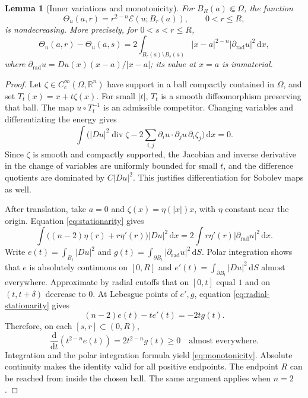 \documentclass[11pt,a4paper]{article}
\numberwithin{equation}{section}
\newtheorem{lemma}[theorem]{Lemma}
\theoremstyle{definition}
\newcommand{\R}{\mathbb R}
\newcommand{\dd}{\,\mathrm d}
\newcommand{\dx}{\dd x}
\newcommand{\E}{\mathcal E}
\newcommand{\Th}{\Theta}
\begin{document}
\begin{lemma}[Inner variations and monotonicity]\label{lem:monotonicity}
For $B_R(a)\Subset\Omega$, the function
\[
\Th_u(a,r)=r^{2-n}\E(u;B_r(a)),\qquad0<r\le R,
\]
is nondecreasing. More precisely, for $0<s<r\le R$,
\begin{equation}\label{eq:monotonicity}
\Th_u(a,r)-\Th_u(a,s)
=2\int_{B_r(a)\setminus B_s(a)}
|x-a|^{2-n}|\partial_{\mathrm{rad}}u|^2\dx,
\end{equation}
where $\partial_{\mathrm{rad}}u=Du(x)(x-a)/|x-a|$; its value at $x=a$ is immaterial.
\end{lemma}
\begin{proof}
Let $\zeta\in C_c^\infty(\Omega,\R^n)$ have support in a ball compactly contained in $\Omega$, and set $T_t(x)=x+t\zeta(x)$. For small $|t|$, $T_t$ is a smooth diffeomorphism preserving that ball. The map $u\circ T_t^{-1}$ is an admissible competitor. Changing variables and differentiating the energy gives
\begin{equation}\label{eq:stationarity}
\int\bigl(|Du|^2\operatorname{div}\zeta
-2\sum_{i,j}\partial_i u\cdot\partial_j u\,\partial_i\zeta_j\bigr)\dx=0.
\end{equation}
Since $\zeta$ is smooth and compactly supported, the Jacobian and inverse derivative in the change of variables are uniformly bounded for small $t$, and the difference quotients are dominated by $C|Du|^2$. This justifies differentiation for Sobolev maps as well.

After translation, take $a=0$ and $\zeta(x)=\eta(|x|)x$, with $\eta$ constant near the origin. Equation \eqref{eq:stationarity} gives
\begin{equation}\label{eq:radial-stationarity}
\int\bigl((n-2)\eta(r)+r\eta'(r)\bigr)|Du|^2\dx
=2\int r\eta'(r)|\partial_{\mathrm{rad}}u|^2\dx.
\end{equation}
Write $e(t)=\int_{B_t}|Du|^2$ and $g(t)=\int_{\partial B_t}|\partial_{\mathrm{rad}}u|^2\dd S$. Polar integration shows that $e$ is absolutely continuous on $[0,R]$ and $e'(t)=\int_{\partial B_t}|Du|^2\dd S$ almost everywhere. Approximate by radial cutoffs that on $[0,t]$ equal $1$ and on $(t,t+\delta)$ decrease to $0$. At Lebesgue points of $e',g$, equation \eqref{eq:radial-stationarity} gives
\[
(n-2)e(t)-t e'(t)=-2t g(t).
\]
Therefore, on each $[s,r]\subset(0,R)$,
\[
\frac{\mathrm d}{\mathrm dt}(t^{2-n}e(t))=2t^{2-n}g(t)\ge0
\quad\text{almost everywhere}.
\]
Integration and the polar integration formula yield \eqref{eq:monotonicity}. Absolute continuity makes the identity valid for all positive endpoints. The endpoint $R$ can be reached from inside the chosen ball. The same argument applies when $n=2$.
\end{proof}
\end{document}

